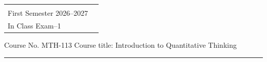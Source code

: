 \documentclass[a4paper,leqno,12pt]{amsart}
\begin{document}
\hspace*{1.9cm}%
\begin{tabular}{@{}p{}p{}@{}}
 {\raggedright
   \begin{center} 
   \textbf{AZIM PREMJI UNIVERSITY, BHOPAL}\\
   First Semester 2026--2027 \\
   In Class Exam--1
   \end{center}
  } %
\end{tabular}


\noindent Course No. MTH-113 \hfill  Course title: Introduction to Quantitative Thinking
\vspace{.3cm}
\hrule 
\vspace{.3cm}
\end{document}
